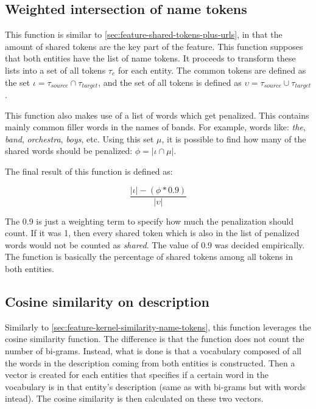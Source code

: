 \documentclass[epsfig,a4paper,11pt,titlepage,twoside,openany]{book}
\begin{document}
\subsection{Weighted intersection of name tokens}
\label{sec:feature-wighted-name-intersection}

This function is similar to \autoref{sec:feature-shared-tokens-plus-urls}, in that the amount of shared tokens are the key part of the feature. This function supposes that both entities have the list of name tokens. It proceeds to transform these lists into a set of all tokens $\tau_e$ for each entity. The common tokens are defined as the set $\iota = \tau_{source} \cap \tau_{target}$, and the set of all tokens is defined as $\upsilon = \tau_{source} \cup \tau_{target}$. 

This function also makes use of a list of words which get penalized. This contains mainly common filler words in the names of bands. For example, words like: \textit{the}, \textit{band}, \textit{orchestra}, \textit{boys}, etc. Using this set $\mu$, it is possible to find how many of the shared words should be penalized: $\phi = |\iota \cap \mu|$.

The final result of this function is defined as:

\begin{equation*}
    \frac{
    |\iota| - (\phi * 0.9)
    }{
    |\upsilon|
    }
\end{equation*}

The 0.9 is just a weighting term to specify how much the penalization should count. If it was 1, then every shared token which is also in the list of penalized words would not be counted as \textit{shared}. The value of 0.9 was decided empirically. The function is basically the percentage of shared tokens among all tokens in both entities.


\subsection{Cosine similarity on description}
\label{sec:feature-cosine-similarity-description}

Similarly to \autoref{sec:feature-kernel-similarity-name-tokens}, this function leverages the cosine similarity function. The difference is that the function does not count the number of bi-grams. Instead, what is done is that a vocabulary composed of all the words in the description coming from both entities is constructed. Then a vector is created for each entities that specifies if a certain word in the vocabulary is in that entity's description (same as with bi-grams but with words intead). The cosine similarity is then calculated on these two vectors.
\end{document}
